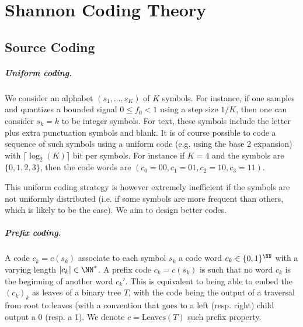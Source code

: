 

\chapter{Shannon Coding Theory}
\label{sec-shannon}

\section{Source Coding}
\label{sec-shannon-source}

\newcommand{\Symb}{s}

\paragraph{Uniform coding.}

We consider an alphabet $(\Symb_1,\ldots,\Symb_K)$ of $K$ symbols. For instance, if one samples and quantizes a bounded signal $0 \leq f_0 < 1$ using a step size $1/K$, then one can consider $\Symb_k=k$ to be integer symbols. For text, these symbols include the letter plus extra punctuation symbols and blank. 
%
It is of course possible to code a sequence of such symbols using a uniform code (e.g. using the base 2 expansion) with $\lceil \log_2(K) \rceil$ bit per symbols.
For instance if $K=4$ and the symbols are $\{0,1,2,3\}$, then the code words are $(c_0=00,c_1=01,c_2=10,c_3=11)$. 

This uniform coding strategy is however extremely inefficient if the symbols are not uniformly distributed (i.e. if some symbols are more frequent than others, which is likely to be the case). We aim to design better codes.

\paragraph{Prefix coding.}
 

A code $c_k=c(\Symb_k)$ associate to each symbol $\Symb_k$ a code word $c_k \in \{0,1\}^\NN$ with a varying length $|c_k| \in \NN^*$. 
%
A prefix code $c_k=c(\Symb_k)$ is such that no word $c_k$ is the beginning of another word $c_k'$. This is equivalent to being able to embed the $(c_k)_k$ as leaves of a binary tree $T$, with the code being the output of a traversal from root to leaves (with a convention that goes to a left (resp. right) child output a 0 (resp. a 1). 
%
We denote $c=\text{Leaves}(T)$ such prefix property. 


